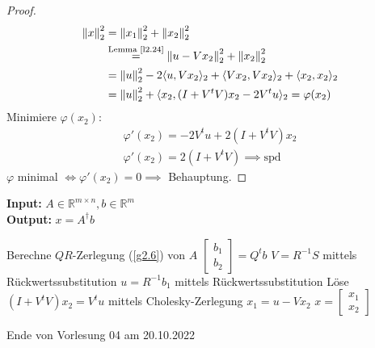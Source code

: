 \documentclass{book}
\def\R{\mathbb{R}}
\begin{document}
            \begin{proof}
                \begin{align*}
                    \left\Vert x \right\Vert_2^2 &= \left\Vert x_1 \right\Vert_2^2 + \left\Vert x_2 \right\Vert_2^2\\
                    &\stackrel{\text{Lemma \ref{l2.24}}}{=}\left\Vert u-Vx_2 \right\Vert_2^2+ \left\Vert x_2 \right\Vert_2^2\\
                    &=\left\Vert u \right\Vert_2^2-2 \langle u,Vx_2 \rangle_2+\langle Vx_2,Vx_2 \rangle_2+\langle x_2,x_2 \rangle_2\\
                    &=\left\Vert u \right\Vert_2^2+\langle x_2,(I+V^tV)x_2-2V^tu \rangle_2 = \varphi(x_2)
                \end{align*}
                Minimiere $\varphi(x_2)$:
                \begin{align*}
                    \varphi'(x_2)=-2V^tu+2(I+V^tV)x_2\\
                    \varphi'(x_2)=2(I+V^tV) \implies \text{spd}
                \end{align*}
                $\varphi$ minimal $\iff \varphi'(x_2)=0\implies $ Behauptung.
            \end{proof}

            \begin{algorithm}[H]
                \caption{}\label{a2.26}
                \textbf{Input:} $A\in\R^{m\times n},b\in\R^m$\\
                \textbf{Output:} $x=A^\dagger b$
                \begin{algorithmic}
                \State Berechne $QR$-Zerlegung (\ref{g2.6}) von $A$
                \State $\begin{bmatrix}b_1\\b_2\end{bmatrix}=Q^t b$
                \State $V=R^{-1}S$ mittels Rückwertssubstitution 
                \State $u=R^{-1}b_1$ mittels Rückwertssubstitution
                \State Löse $(I+V^tV)x_2=V^tu$ mittels Cholesky-Zerlegung 
                \State $x_1=u-Vx_2$
                \State $x=\begin{bmatrix}x_1\\x_2\end{bmatrix}$
                \end{algorithmic}
            \end{algorithm}

            \noindent
            \xrfill[0.7ex]{1pt}Ende von Vorlesung 04 am 20.10.2022\xrfill[0.7ex]{1pt}
            
\end{document}
